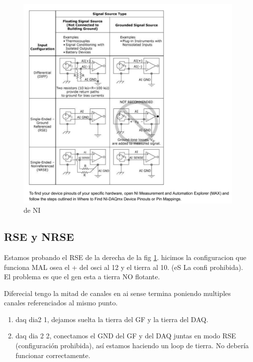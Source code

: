 \documentclass[a4paper,12pt]{article}
\begin{document}
\begin{figure}
    \centering
    \includegraphics[scale=0.6]{imagenes/SNRE2.pdf}
    \caption{de NI}
    \label{fig:snre2}
\end{figure}

\subsection{RSE y NRSE}

Estamos probando el RSE de la derecha de la fig \ref{fig:snre2}. hicimos la configuracion que funciona MAL osea el + del osci al 12 y el tierra al 10. (eS La confi prohibida). El problema es que el gen esta a tierra NO flotante. 

Diferecial tengo la mitad de canales
en ai sense termina poniendo multiples canales referenciados al mismo punto. 

\begin{enumerate}
    \item daq dia2 1, dejamos suelta la tierra del GF y la tierra del DAQ.
    \item  daq dia 2 2, conectamos el GND del GF y del DAQ juntas en modo RSE (configuración prohibida), así estamos haciendo un loop de tierra. No debería funcionar correctamente.

\end{enumerate}{}
\end{document}
